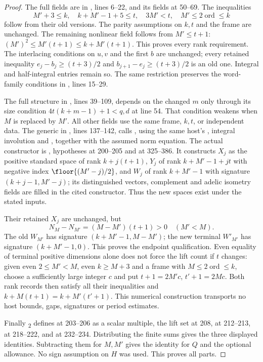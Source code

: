 \documentclass[11pt,a4paper]{article}
\theoremstyle{definition}\newtheorem{remark}[theorem]{Remark}
\begin{document}
\begin{proof}
The full  fields are in , lines 6--22, and its  fields at 50--69. The inequalities
\[
 M'+3\le k,\quad k+M'-1+5\le t,\quad 3M'<t,\quad
 M'\le2\operatorname{ord}\le k
\]
follow from their old versions. The parity assumptions on $k,t$ and the frame are unchanged. The remaining nonlinear field follows from $M'\le t+1$:
$(M')^2\le M'(t+1)\le k+M'(t+1)$.
This proves every rank requirement.
The interlacing conditions on $u,v$ and the first $b$ are unchanged; every retained inequality
$e_j-b_j\ge(t+3)/2$ and $b_{j+1}-e_j\ge(t+3)/2$ is an old one. Integral and half-integral entries remain so. The same restriction preserves the word-family conditions in , lines 15--29.

The full  structure in , lines 39--109, depends on the changed $m$ only through its size condition
$4t(k+m-1)+1<q,d$ at line 54. That condition weakens when $M$ is replaced by $M'$. All other fields use the same frame, $k,t$, or independent data.
The generic  in
, lines 137--142, calls , using the same host's , integral involution and , together with the assumed norm equation.
The actual constructor is , hypotheses at 200--205 and  at 325--386. It constructs $X_j$ as the positive standard space of rank $k+j(t+1)$, $Y_j$ of rank $k+M'-1+jt$ with negative index $\floor{(M'-j)/2}$, and $W_j$ of rank $k+M'-1$ with signature $(k+j-1,M'-j)$; its distinguished vectors, complement and adelic isometry fields are filled in the cited constructor. Thus the new spaces exist under the stated inputs.

Their retained $X_j$ are unchanged, but
\[
 N_M-N_{M'}=(M-M')(t+1)>0\quad(M'<M).
\]
The old $W_{M'}$ has signature $(k+M'-1,M-M')$; the new terminal $W'_{M'}$ has signature $(k+M'-1,0)$. This proves the endpoint qualification.
Even equality of terminal positive dimensions alone does not force the lift count if $t$ changes: given even $2\le M'<M$, even $k\ge M+3$ and a frame with $M\le2\operatorname{ord}\le k$, choose a sufficiently large integer $c$ and put
$t+1=2M'c$, $t'+1=2Mc$.
Both rank records then satisfy all their inequalities and
$k+M(t+1)=k+M'(t'+1)$.
This numerical construction transports no host bounds, gaps, signatures or period estimates.

Finally \textsubscript{2} defines  at 203--206 as a scalar multiple, the lift set at 208,  at 212--213,  at 218--222, and  at 232--234. Distributing the finite sums gives the three displayed identities. Subtracting them for $M,M'$ gives the identity for $Q$ and the optional allowance. No sign assumption on $H$ was used. This proves all parts.
\end{proof}
\end{document}
